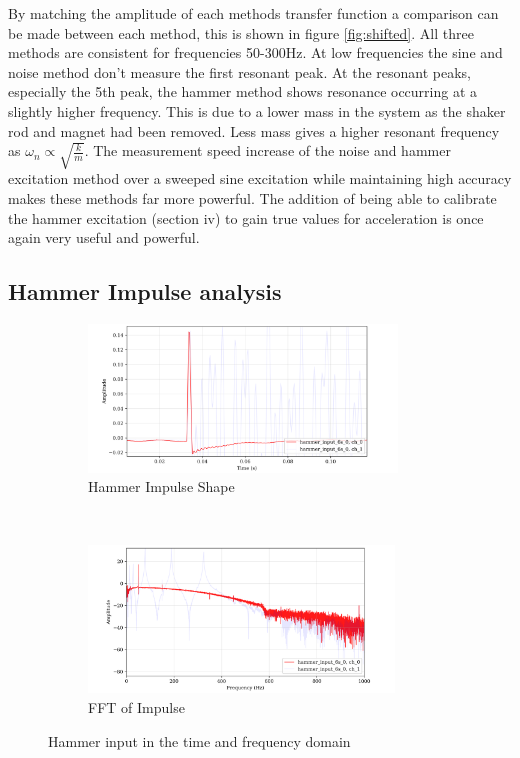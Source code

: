 \documentclass[twoside,onecolumn]{article}
\begin{document}
By matching the amplitude of each methods transfer function a comparison can be made between each method, this is shown in figure \ref{fig:shifted}. All three methods are consistent for frequencies 50-300Hz. At low frequencies the sine and noise method don't measure the first resonant peak. At the resonant peaks, especially the 5th peak,  the hammer method shows resonance occurring at a slightly higher frequency. This is due to a lower mass in the system as the shaker rod and magnet had been removed. Less mass gives a higher resonant frequency as $\omega_n \propto \sqrt{\frac{k}{m}}$. The measurement speed increase of the noise and hammer excitation method over a sweeped sine excitation while maintaining high accuracy makes these methods far more powerful. The addition of being able to calibrate the hammer excitation (section iv) to gain true values for acceleration is once again very useful and powerful.

\subsection{Hammer Impulse analysis}
\begin{figure}[!htb]
    \centering
    \begin{subfigure}[t]{0.5\textwidth}
        \centering
        \includegraphics[height=1.55in]{3-updatedhammershape}
        \caption{Hammer Impulse Shape}
    \end{subfigure}%
    ~ 
    \begin{subfigure}[t]{0.5\textwidth}
        \centering
        \includegraphics[height=1.55in]{3-updatedffthammer}
        \caption{FFT of Impulse}
    \end{subfigure}
    \caption{Hammer input in the time and frequency domain}
    \label{fig:impulse}
\end{figure}
\end{document}

